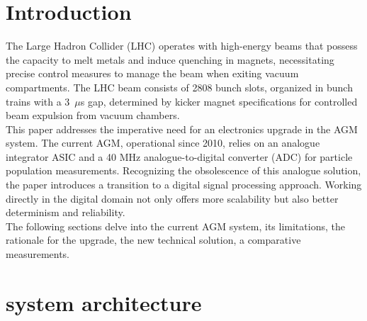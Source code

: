 \section{Introduction}
The Large Hadron Collider (LHC) operates with high-energy beams that possess
the capacity to melt metals and induce quenching in magnets, necessitating
precise control measures to manage the beam when exiting vacuum compartments.
The LHC beam consists of 2808 bunch slots, organized in bunch trains with a
3~$\mu$s gap, determined by kicker magnet specifications for controlled
beam expulsion from vacuum chambers.\\
This paper addresses the imperative need for an electronics upgrade in the AGM
system. The current AGM, operational since 2010, relies on an analogue
integrator ASIC and a 40 MHz analogue-to-digital converter (ADC) for particle
population measurements. Recognizing the obsolescence of this analogue
solution, the paper introduces a transition to a digital signal processing
approach. Working directly in the digital domain not only offers more
scalability but also better determinism and reliability.\\
The following sections delve into the current AGM system, its limitations, the
rationale for the upgrade, the new technical solution, a comparative
measurements.


\section{system architecture}

